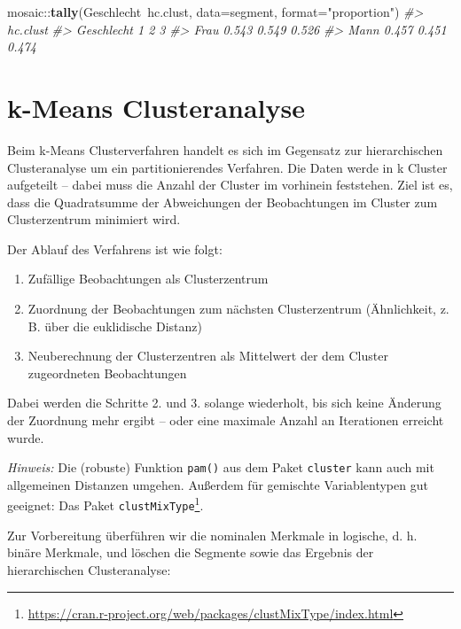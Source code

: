 \documentclass[12pt,]{book}
\makeatletter
\newenvironment{Shaded}{\begin{snugshade}}{\end{snugshade}}
\newcommand{\KeywordTok}[1]{\textcolor[rgb]{0.13,0.29,0.53}{\textbf{{#1}}}}
\newcommand{\DataTypeTok}[1]{\textcolor[rgb]{0.13,0.29,0.53}{{#1}}}
\newcommand{\StringTok}[1]{\textcolor[rgb]{0.31,0.60,0.02}{{#1}}}
\newcommand{\CommentTok}[1]{\textcolor[rgb]{0.56,0.35,0.01}{\textit{{#1}}}}
\newcommand{\NormalTok}[1]{{#1}}
\providecommand{\tightlist}{%
  \setlength{\itemsep}{0pt}\setlength{\parskip}{0pt}}
\renewcommand{\href}[2]{#2\footnote{\url{#1}}}
\newenvironment{kframe}{%
\medskip{}
\setlength{\fboxsep}{.8em}
 \def\at@end@of@kframe{}%
 \ifinner\ifhmode%
  \def\at@end@of@kframe{\end{minipage}}%
  \begin{minipage}{\columnwidth}%
 \fi\fi%
 \def\FrameCommand##1{\hskip\@totalleftmargin \hskip-\fboxsep
 \colorbox{shadecolor}{##1}\hskip-\fboxsep
     \hskip-\linewidth \hskip-\@totalleftmargin \hskip\columnwidth}%
 \MakeFramed {\advance\hsize-\width
   \@totalleftmargin\z@ \linewidth\hsize
   \@setminipage}}%
 {\par\unskip\endMakeFramed%
 \at@end@of@kframe}
\renewenvironment{Shaded}{\begin{kframe}}{\end{kframe}}
\makeatother
\begin{document}
\begin{Shaded}
\begin{Highlighting}[]
\NormalTok{mosaic::}\KeywordTok{tally}\NormalTok{(Geschlecht~hc.clust, }\DataTypeTok{data=}\NormalTok{segment, }\DataTypeTok{format=}\StringTok{"proportion"}\NormalTok{)}
\CommentTok{#>           hc.clust}
\CommentTok{#> Geschlecht     1     2     3}
\CommentTok{#>       Frau 0.543 0.549 0.526}
\CommentTok{#>       Mann 0.457 0.451 0.474}
\end{Highlighting}
\end{Shaded}

\section{k-Means Clusteranalyse}\label{k-means-clusteranalyse}

Beim k-Means Clusterverfahren handelt es sich im Gegensatz zur
hierarchischen Clusteranalyse um ein partitionierendes Verfahren. Die
Daten werde in k Cluster aufgeteilt -- dabei muss die Anzahl der Cluster
im vorhinein feststehen. Ziel ist es, dass die Quadratsumme der
Abweichungen der Beobachtungen im Cluster zum Clusterzentrum minimiert
wird.

Der Ablauf des Verfahrens ist wie folgt:

\begin{enumerate}
\def\labelenumi{\arabic{enumi}.}
\tightlist
\item
  Zufällige Beobachtungen als Clusterzentrum
\item
  Zuordnung der Beobachtungen zum nächsten Clusterzentrum (Ähnlichkeit,
  z. B. über die euklidische Distanz)
\item
  Neuberechnung der Clusterzentren als Mittelwert der dem Cluster
  zugeordneten Beobachtungen
\end{enumerate}

Dabei werden die Schritte 2. und 3. solange wiederholt, bis sich keine
Änderung der Zuordnung mehr ergibt -- oder eine maximale Anzahl an
Iterationen erreicht wurde.

\emph{Hinweis:} Die (robuste) Funktion \texttt{pam()} aus dem Paket
\texttt{cluster} kann auch mit allgemeinen Distanzen umgehen. Außerdem
für gemischte Variablentypen gut geeignet: Das Paket
\href{https://cran.r-project.org/web/packages/clustMixType/index.html}{\texttt{clustMixType}}.

Zur Vorbereitung überführen wir die nominalen Merkmale in logische, d.
h. binäre Merkmale, und löschen die Segmente sowie das Ergebnis der
hierarchischen Clusteranalyse:
\end{document}

